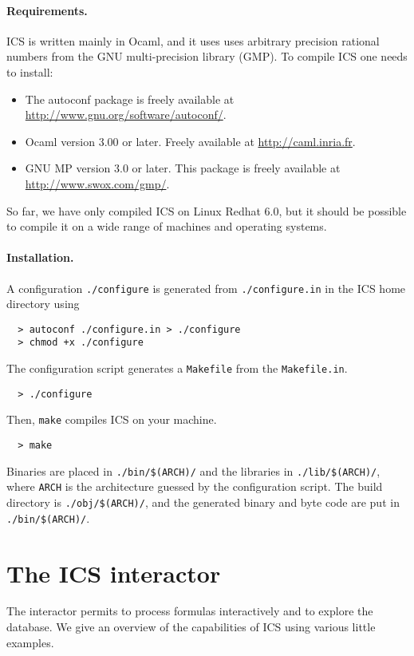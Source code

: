 \documentclass[12pt]{article}
\begin{document}
\paragraph{Requirements.}
ICS is written mainly in Ocaml, and it uses uses arbitrary
precision rational numbers from the GNU multi-precision library (GMP)\@.
To compile ICS one needs to install:
  \begin{itemize}
  \item The \textsf{autoconf} package is freely available
        at \url{http://www.gnu.org/software/autoconf/}\@.
  \item \textsf{Ocaml} version 3.00 or later.
        Freely available at \url{http://caml.inria.fr}\@.
  \item \textsf{GNU MP} version 3.0 or later. This package is
        freely available at \url{http://www.swox.com/gmp/}\@.
  \end{itemize}
So far, we have only compiled \textsf{ICS} on \textsf{Linux Redhat 6.0},
but it should be possible to compile it on a wide range of
machines and operating systems.

\paragraph{Installation.}
A configuration \texttt{./configure} is generated from
\texttt{./configure.in} in the ICS home directory using
  \begin{verbatim}
  > autoconf ./configure.in > ./configure
  > chmod +x ./configure
  \end{verbatim}
The configuration script generates a \texttt{Makefile} from the
\texttt{Makefile.in}. 
  \begin{verbatim}
  > ./configure
  \end{verbatim}
Then, {\tt make} compiles ICS on your machine.
  \begin{verbatim}
  > make
  \end{verbatim}
Binaries are placed in \texttt{./bin/\$(ARCH)/} and
the libraries in {\tt ./lib/\$(ARCH)/}, where \texttt{ARCH}
is the architecture guessed by the configuration script.
The build directory is {\tt ./obj/\$(ARCH)/}, and the generated
binary and byte code are put in \texttt{./bin/\$(ARCH)/}.


\section{The ICS interactor}\label{sec:interactor}

The interactor permits to process formulas interactively and to explore
the database.  We give an overview of the capabilities of ICS
using various little examples.
\end{document}
